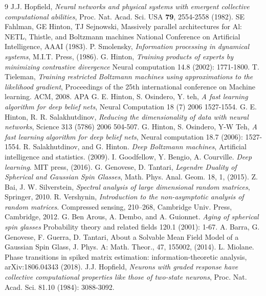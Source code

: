\documentclass[10pt,oneside,a4paper,reqno]{amsart}  %
\theoremstyle{plain}
\numberwithin{equation}{section}
\begin{document}
\begin{thebibliography}{9}
%
 J.J. Hopfield, {\em Neural networks and physical systems with emergent collective computational abilities}, Proc. Nat. Acad. Sci. USA \textbf{79},  2554-2558 (1982).
%
 SE Fahlman, GE Hinton, TJ Sejnowski, {Massively parallel architectures for Al: NETL, Thistle, and Boltzmann machines
National Conference on Artificial Intelligence}, AAAI (1983).
%
 P. Smolensky, {\em Information processing in dynamical systems}, M.I.T. Press, (1986).
%
 G. Hinton, {\em  Training products of experts by minimizing contrastive divergence}
Neural computation 14.8 (2002): 1771-1800.
%
 T. Tieleman, {\em Training restricted Boltzmann machines using approximations to the likelihood gradient}, Proceedings of the 25th international conference on Machine learning. ACM, 2008. APA	
%
 G. E. Hinton, S. Osindero, Y. teh, {\em A fast learning algorithm for deep belief nets}, Neural Computation 18 (7) 2006 1527-1554. 
%
 G. E. Hinton, R. R. Salakhutdinov, {\em Reducing the dimensionality of data with neural networks}, Science 313 (5786) 2006 504-507. 
%
 G. Hinton, S. Osindero, Y-W Teh, {\em A fast learning algorithm for deep belief nets}, Neural computation 18.7 (2006): 1527-1554.
%
 R. Salakhutdinov, and G. Hinton. {\em Deep Boltzmann machines}, Artificial intelligence and statistics. (2009).
%
 I. Goodfellow, Y. Bengio, A. Courville. {\em Deep learning}. MIT press, (2016).
%
 G. Genovese, D. Tantari, {\em Legendre Duality of Spherical and Gaussian Spin Glasses}, Math. Phys. Anal. Geom. 18, 1, (2015).
%
 Z. Bai, J. W. Silverstein, {\em Spectral analysis of large dimensional random matrices}, Springer, 2010.
%
 R. Vershynin, {\em Introduction to the non-asymptotic analysis of random matrices}. Compressed sensing, 210--268, Cambridge Univ. Press, Cambridge, 2012.
%
 G. Ben Arous, A. Dembo, and A. Guionnet. {\em Aging of spherical spin glasses} Probability theory and related fields 120.1 (2001): 1-67.
%
 A. Barra, G. Genovese, F. Guerra, D. Tantari, {About a Solvable Mean Field Model of a Gaussian Spin Glass}, J. Phys. A: Math. Theor., 47, 155002, (2014).
%
 L. Miolane. {Phase transitions in spiked matrix estimation: information-theoretic analysis}, arXiv:1806.04343 (2018).
%
 J.J. Hopfield, {\em Neurons with graded response have collective computational properties like those of two-state neurons}, Proc. Nat. Acad. Sci. 81.10 (1984): 3088-3092.

\end{thebibliography}
\end{document}
